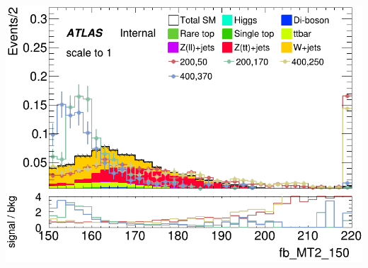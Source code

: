 \documentclass[usenames,dvipsnames]{beamer}
\begin{document}
\begin{frame}
\begin{minipage}{0.32\textwidth}
        \includegraphics[width=\textwidth]{graphics/HH_met_sig/HH_fb_MT2_150_norm.png}
    \end{minipage}
\end{frame}

%    
%
\end{document}
